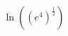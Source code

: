\documentclass[preview]{standalone}
\begin{document}
\begin{align*}
\ln  ( (e{^4}) ^ {\frac{1}{2} })
\end{align*}
\end{document}
